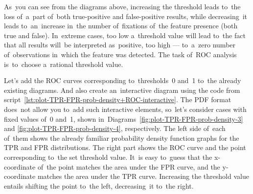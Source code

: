 \documentclass[]{scrreprt}
\begin{document}
As~you can see from the diagrams above, increasing the threshold leads to~the loss of~a~part of~both true-positive and false-positive results, while decreasing~it leads to~an~increase in~the number of~fixations of~the feature presence (both true and false). In~extreme cases, too low a~threshold value will lead to~the fact that all results will~be interpreted as~positive, too high --- to~a~zero number of~observations in~which the feature was detected. The task of~ROC analysis is~to~choose a~rational threshold value.

Let's add the ROC curves corresponding to~thresholds~0 and~1 to~the already existing diagrams. And also create an~interactive diagram using the code from script~\ref{lst:plot-TPR-FPR-prob-density+ROC-interactive}. The PDF format does~not allow you to~add such interactive elements, so~let's consider cases with fixed values of~0 and~1, shown in~Diagrams~\ref{fig:plot-TPR-FPR-prob-density-3} and \ref{fig:plot-TPR-FPR-prob-density-4}, respectively. The left side of~each of~them shows the already familiar probability density function graphs for the TPR and FPR distributions. The right part shows the ROC curve and the point corresponding to~the set threshold value. It~is easy to~guess that the x-coordinate of~the point matches the area under the FPR curve, and the y-coordinate matches the area under the TPR curve. Increasing the threshold value entails shifting the point to~the left, decreasing~it to~the right.
\end{document}
